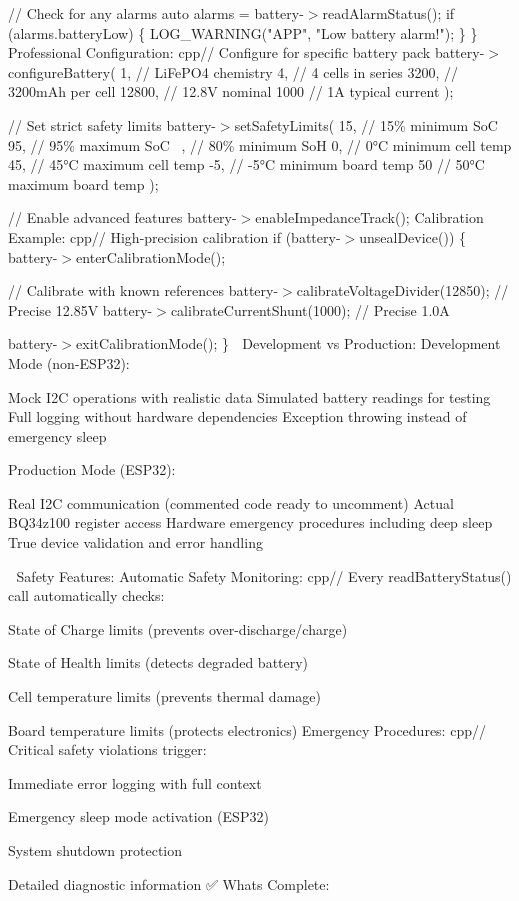 // Check for any alarms auto alarms = battery-\/\texorpdfstring{$>$}{>}read\+Alarm\+Status(); if (alarms.\+battery\+Low) \{ LOG\+\_\+\+WARNING("{}\+APP"{}, "{}\+Low battery alarm!"{}); \} \} Professional Configuration\+: cpp// Configure for specific battery pack battery-\/\texorpdfstring{$>$}{>}configure\+Battery( 1, // Li\+Fe\+PO4 chemistry 4, // 4 cells in series 3200, // 3200m\+Ah per cell 12800, // 12.\+8V nominal 1000 // 1A typical current );

// Set strict safety limits battery-\/\texorpdfstring{$>$}{>}set\+Safety\+Limits( 15, // 15\% minimum SoC 95, // 95\% maximum SoC ~, // 80\% minimum SoH 0, // 0°C minimum cell temp 45, // 45°C maximum cell temp -\/5, // -\/5°C minimum board temp 50 // 50°C maximum board temp );

// Enable advanced features battery-\/\texorpdfstring{$>$}{>}enable\+Impedance\+Track(); Calibration Example\+: cpp// High-\/precision calibration if (battery-\/\texorpdfstring{$>$}{>}unseal\+Device()) \{ battery-\/\texorpdfstring{$>$}{>}enter\+Calibration\+Mode();

// Calibrate with known references battery-\/\texorpdfstring{$>$}{>}calibrate\+Voltage\+Divider(12850); // Precise 12.\+85V battery-\/\texorpdfstring{$>$}{>}calibrate\+Current\+Shunt(1000); // Precise 1.\+0A

battery-\/\texorpdfstring{$>$}{>}exit\+Calibration\+Mode(); \} 🔧 Development vs Production\+: Development Mode (non-\/\+ESP32)\+:

Mock I2C operations with realistic data Simulated battery readings for testing Full logging without hardware dependencies Exception throwing instead of emergency sleep

Production Mode (ESP32)\+:

Real I2C communication (commented code ready to uncomment) Actual BQ34z100 register access Hardware emergency procedures including deep sleep True device validation and error handling

🚨 Safety Features\+: Automatic Safety Monitoring\+: cpp// Every read\+Battery\+Status() call automatically checks\+:
\begin{DoxyItemize}
\item State of Charge limits (prevents over-\/discharge/charge)
\item State of Health limits (detects degraded battery)
\item Cell temperature limits (prevents thermal damage) ~\newline

\item Board temperature limits (protects electronics) Emergency Procedures\+: cpp// Critical safety violations trigger\+:
\item Immediate error logging with full context
\item Emergency sleep mode activation (ESP32)
\item System shutdown protection
\item Detailed diagnostic information ✅ What\textquotesingle{}s Complete\+:
\end{DoxyItemize}

